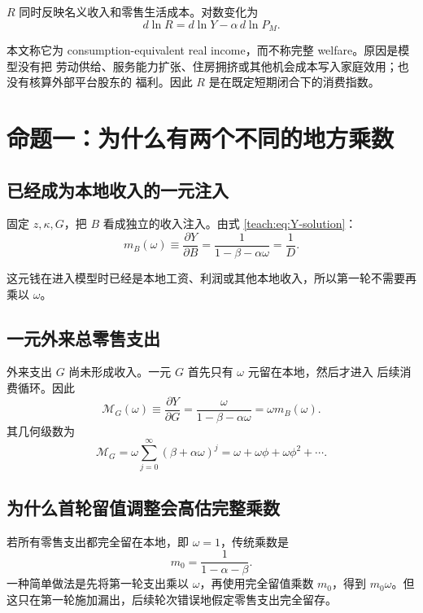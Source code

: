 \documentclass[UTF8,11pt,scheme=chinese,fontset=fandol]{ctexart}
\newcommand{\MG}{\mathcal M_G}
\theoremstyle{definition}
\begin{document}
\(R\) 同时反映名义收入和零售生活成本。对数变化为
\begin{equation}
d\ln R=d\ln Y-\alpha\,d\ln P_M.
\end{equation}

本文称它为 consumption-equivalent real income，而不称完整 welfare。原因是模型没有把
劳动供给、服务能力扩张、住房拥挤或其他机会成本写入家庭效用；也没有核算外部平台股东的
福利。因此 \(R\) 是在既定短期闭合下的消费指数。

\section{命题一：为什么有两个不同的地方乘数}

\subsection{已经成为本地收入的一元注入}

固定 \(z,\kappa,G\)，把 \(B\) 看成独立的收入注入。由式 \eqref{teach:eq:Y-solution}：
\begin{equation}
m_B(\omega)
\equiv\frac{\partial Y}{\partial B}
=\frac1{1-\beta-\alpha\omega}
=\frac1D.
\label{teach:eq:mB}
\end{equation}

这元钱在进入模型时已经是本地工资、利润或其他本地收入，所以第一轮不需要再乘以
\(\omega\)。

\subsection{一元外来总零售支出}

外来支出 \(G\) 尚未形成收入。一元 \(G\) 首先只有 \(\omega\) 元留在本地，然后才进入
后续消费循环。因此
\begin{equation}
\MG(\omega)
\equiv\frac{\partial Y}{\partial G}
=\frac{\omega}{1-\beta-\alpha\omega}
=\omega m_B(\omega).
\label{teach:eq:MG}
\end{equation}
其几何级数为
\begin{equation}
\MG
=\omega\sum_{j=0}^{\infty}(\beta+\alpha\omega)^j
=\omega+\omega\phi+\omega\phi^2+\cdots.
\label{teach:eq:MG-series}
\end{equation}

\subsection{为什么首轮留值调整会高估完整乘数}

若所有零售支出都完全留在本地，即 \(\omega=1\)，传统乘数是
\begin{equation}
m_0=\frac1{1-\alpha-\beta}.
\end{equation}
一种简单做法是先将第一轮支出乘以 \(\omega\)，再使用完全留值乘数 \(m_0\)，得到
\(m_0\omega\)。但这只在第一轮施加漏出，后续轮次错误地假定零售支出完全留存。
\end{document}
